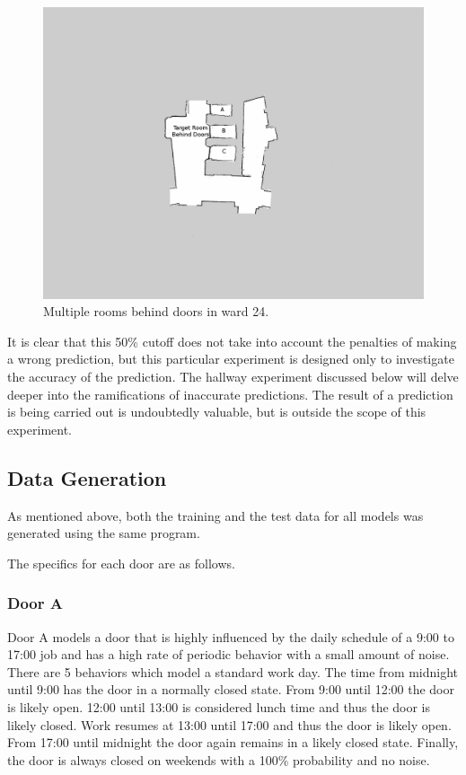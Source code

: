   \begin{figure}[!htb]
    \centering
    \includegraphics[width=\linewidth]{images/ward_24_door.png}
    \caption{Multiple rooms behind doors in ward 24.}
    \label{figure:ward_24_door}
  \end{figure}

  It is clear that this 50\% cutoff does not take into account the penalties
  of making a wrong prediction, but this particular experiment is designed only to
  investigate the accuracy of the prediction. The hallway experiment discussed
  below will delve deeper into the ramifications of inaccurate
  predictions. The result of a prediction is
  being carried out is undoubtedly valuable, but is outside the scope of this
  experiment.

  \subsection{ Data Generation }

  As mentioned above, both the training and the test data for all models was
  generated using the same program.

  The specifics for each door are as follows.

  \subsubsection{ Door A }

  Door A models a door that is highly influenced by the daily schedule of a
  9:00 to 17:00 job and has a high rate of periodic behavior with a small
  amount of noise.  There are 5 behaviors which model a standard work day. The
  time from midnight until 9:00 has the door in a normally closed
  state.  From 9:00 until 12:00 the door is likely open. 12:00 until 13:00 is
  considered lunch time and thus the door is likely closed. Work resumes at
  13:00 until 17:00 and thus the door is likely open. From 17:00 until midnight
  the door again remains in a likely closed state. Finally, the door is always
  closed on weekends with a 100\% probability and no noise. \\

